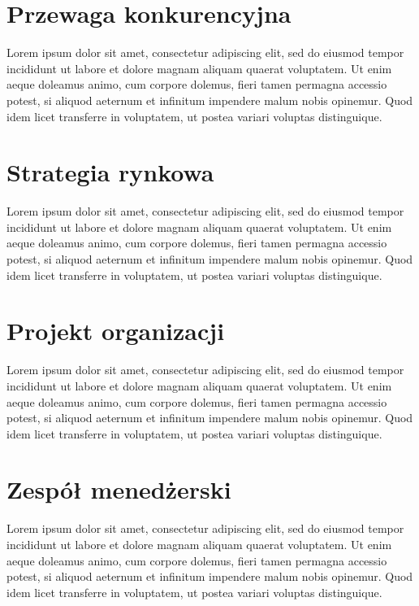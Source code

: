 \section{Przewaga konkurencyjna}

Lorem ipsum dolor sit amet, consectetur adipiscing elit, sed do eiusmod tempor incididunt ut labore et dolore magnam aliquam quaerat voluptatem. Ut enim aeque doleamus animo, cum corpore dolemus, fieri tamen permagna accessio potest, si aliquod aeternum et infinitum impendere malum nobis opinemur. Quod idem licet transferre in voluptatem, ut postea variari voluptas distinguique.

\section{Strategia rynkowa}

Lorem ipsum dolor sit amet, consectetur adipiscing elit, sed do eiusmod tempor incididunt ut labore et dolore magnam aliquam quaerat voluptatem. Ut enim aeque doleamus animo, cum corpore dolemus, fieri tamen permagna accessio potest, si aliquod aeternum et infinitum impendere malum nobis opinemur. Quod idem licet transferre in voluptatem, ut postea variari voluptas distinguique.

\section{Projekt organizacji}

Lorem ipsum dolor sit amet, consectetur adipiscing elit, sed do eiusmod tempor incididunt ut labore et dolore magnam aliquam quaerat voluptatem. Ut enim aeque doleamus animo, cum corpore dolemus, fieri tamen permagna accessio potest, si aliquod aeternum et infinitum impendere malum nobis opinemur. Quod idem licet transferre in voluptatem, ut postea variari voluptas distinguique.

\section{Zespół menedżerski}

Lorem ipsum dolor sit amet, consectetur adipiscing elit, sed do eiusmod tempor incididunt ut labore et dolore magnam aliquam quaerat voluptatem. Ut enim aeque doleamus animo, cum corpore dolemus, fieri tamen permagna accessio potest, si aliquod aeternum et infinitum impendere malum nobis opinemur. Quod idem licet transferre in voluptatem, ut postea variari voluptas distinguique.